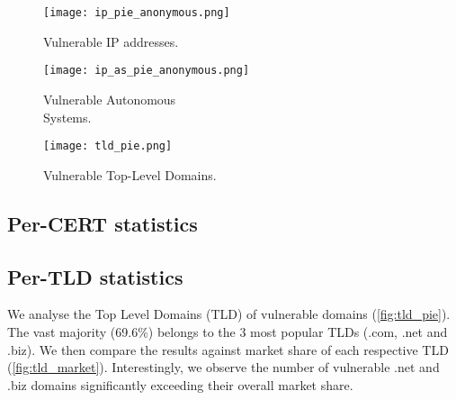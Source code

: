 \begin{figure*}[!ht]
\begin{minipage}[t]{.33\textwidth}
    \texttt{[image: ip\_pie\_anonymous.png]}
    \caption{Vulnerable IP addresses.}
    \label{fig:ip_pie}
\end{minipage}%
\begin{minipage}[t]{.33\textwidth}
    \centering
    \texttt{[image: ip\_as\_pie\_anonymous.png]}
    \caption{Vulnerable Autonomous \\Systems.}
    \label{fig:ip_as_pie}
\end{minipage}%
\begin{minipage}[t]{.33\textwidth}
    \centering
    \texttt{[image: tld\_pie.png]}
    \caption{Vulnerable Top-Level Domains.}
    \label{fig:tld_pie}
\end{minipage}%

\end{figure*}



% 

\subsection{Per-CERT statistics}
\subsection{Per-TLD statistics}

We analyse the Top Level Domains (TLD) of vulnerable domains (\autoref{fig:tld_pie}). The vast majority (69.6\%) belongs to the 3 most popular TLDs (.com, .net and .biz). We then compare the results against market share of each respective TLD (\autoref{fig:tld_market}). Interestingly, we observe the number of vulnerable .net and .biz domains significantly exceeding their overall market share. 


